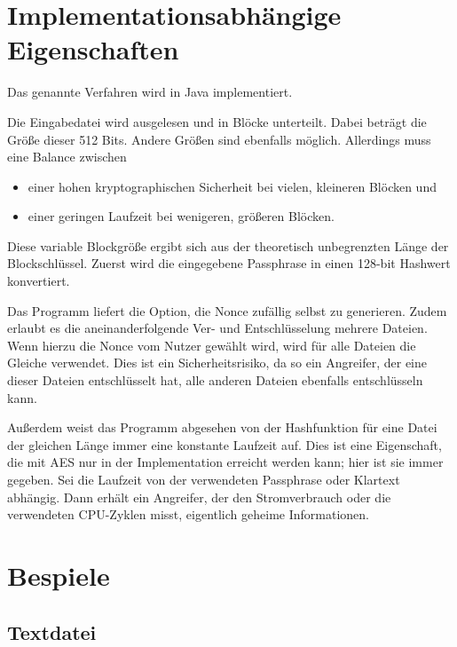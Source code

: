 \documentclass[10pt,a4paper]{article}
\begin{document}
\section{Implementationsabhängige Eigenschaften}

Das genannte Verfahren wird in Java implementiert.

Die Eingabedatei wird ausgelesen und in Blöcke unterteilt.
Dabei beträgt die Größe dieser 512 Bits.
Andere Größen sind ebenfalls möglich.
Allerdings muss eine Balance zwischen
\begin{itemize}
    \item einer hohen kryptographischen Sicherheit bei vielen, kleineren Blöcken und
    \item einer geringen Laufzeit bei wenigeren, größeren Blöcken.
\end{itemize}

Diese variable Blockgröße ergibt sich aus der theoretisch unbegrenzten Länge der Blockschlüssel.
Zuerst wird die eingegebene Passphrase in einen 128-bit Hashwert konvertiert.

Das Programm liefert die Option, die Nonce zufällig selbst zu generieren.
Zudem erlaubt es die aneinanderfolgende Ver- und Entschlüsselung mehrere Dateien.
Wenn hierzu die Nonce vom Nutzer gewählt wird, wird für alle Dateien die Gleiche verwendet.
Dies ist ein Sicherheitsrisiko, da so ein Angreifer, der eine dieser Dateien entschlüsselt hat, alle anderen Dateien ebenfalls entschlüsseln kann.

Außerdem weist das Programm abgesehen von der Hashfunktion für eine Datei der gleichen Länge immer eine konstante Laufzeit auf.
Dies ist eine Eigenschaft, die mit AES nur in der Implementation erreicht werden kann\cite{Pitchaiah2012}; hier ist sie immer gegeben.
Sei die Laufzeit von der verwendeten Passphrase oder Klartext abhängig.
Dann erhält ein Angreifer, der den Stromverbrauch oder die verwendeten CPU-Zyklen misst, eigentlich geheime Informationen.

\section{Bespiele}

\subsection{Textdatei}
\end{document}
